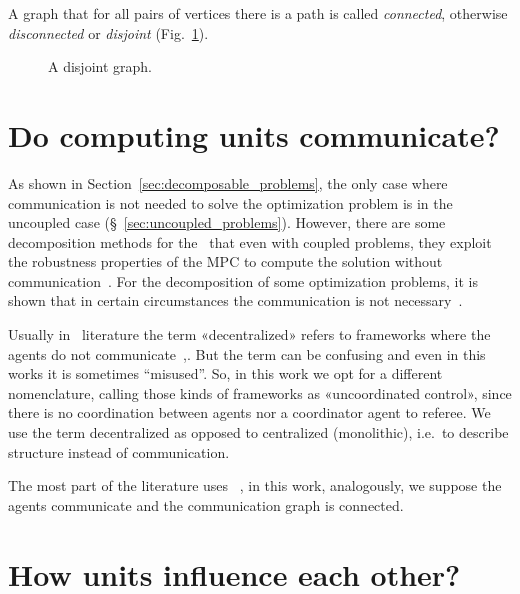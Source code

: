 \documentclass[../main.tex]{subfiles}
\begin{document}
A graph that for all pairs of vertices there is a path is called \emph{connected}, otherwise \emph{disconnected} or \emph{disjoint} (Fig.~\ref{fig:disjoint}).

\begin{figure}[h]
  \centering
  \caption{A disjoint graph.}\label{fig:disjoint}
\end{figure}




\section{Do computing units communicate?}

As shown in Section~\ref{sec:decomposable_problems}, the only case where communication is not needed to solve the optimization problem is in the uncoupled case (\S~\ref{sec:uncoupled_problems}).
However, there are some decomposition methods for the \dmpc\ that even with coupled problems, they exploit the robustness properties of the MPC to compute the solution without communication~\cite{VahidNaghaviEtAl2014}.
For the decomposition of some optimization problems, it is shown that in certain circumstances the communication is not necessary~\cite{VoulgarisElia2022}.
\begin{remark}
  Usually in \dmpc\ literature the term «decentralized» refers to frameworks where the agents do not communicate~\cite[\S 4]{ChristofidesEtAl2013},\cite{NegenbornMaestre2014}.
  But the term can be confusing and even in this works it is sometimes ``misused''.
  So, in this work we opt for a different nomenclature, calling those kinds of frameworks as «uncoordinated control», since there is no coordination between agents nor a coordinator agent to referee. We use the term decentralized as opposed to centralized (monolithic), i.e.\ to describe structure instead of communication.
\end{remark}

The most part of the literature uses \emph{\coordinated}~\cite{NegenbornMaestre2014, ArauzEtAl2021}, in this work, analogously, we suppose the agents communicate and the communication graph is connected.

\section{How units influence each other?}
\end{document}
